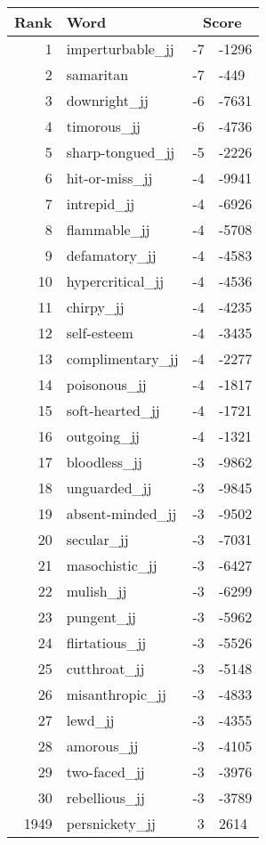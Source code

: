 \begin{longtable}[!htbp]{| rlr@{.}l |}
    \hline
    \textbf{Rank} & \textbf{Word} & \multicolumn{2}{c|}{\textbf{Score}} \\
    \hline
    \endhead
    1 & imperturbable\_jj & -7 & -1296 \\
    2 & samaritan & -7 & -449 \\
    3 & downright\_jj & -6 & -7631 \\
    4 & timorous\_jj & -6 & -4736 \\
    5 & sharp-tongued\_jj & -5 & -2226 \\
    6 & hit-or-miss\_jj & -4 & -9941 \\
    7 & intrepid\_jj & -4 & -6926 \\
    8 & flammable\_jj & -4 & -5708 \\
    9 & defamatory\_jj & -4 & -4583 \\
    10 & hypercritical\_jj & -4 & -4536 \\
    11 & chirpy\_jj & -4 & -4235 \\
    12 & self-esteem & -4 & -3435 \\
    13 & complimentary\_jj & -4 & -2277 \\
    14 & poisonous\_jj & -4 & -1817 \\
    15 & soft-hearted\_jj & -4 & -1721 \\
    16 & outgoing\_jj & -4 & -1321 \\
    17 & bloodless\_jj & -3 & -9862 \\
    18 & unguarded\_jj & -3 & -9845 \\
    19 & absent-minded\_jj & -3 & -9502 \\
    20 & secular\_jj & -3 & -7031 \\
    21 & masochistic\_jj & -3 & -6427 \\
    22 & mulish\_jj & -3 & -6299 \\
    23 & pungent\_jj & -3 & -5962 \\
    24 & flirtatious\_jj & -3 & -5526 \\
    25 & cutthroat\_jj & -3 & -5148 \\
    26 & misanthropic\_jj & -3 & -4833 \\
    27 & lewd\_jj & -3 & -4355 \\
    28 & amorous\_jj & -3 & -4105 \\
    29 & two-faced\_jj & -3 & -3976 \\
    30 & rebellious\_jj & -3 & -3789 \\
    1949 & persnickety\_jj & 3 & 2614 \\

\end{longtable}
